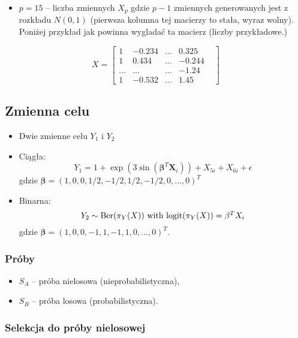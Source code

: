 \documentclass[
]{article}
\providecommand{\tightlist}{%
  \setlength{\itemsep}{0pt}\setlength{\parskip}{0pt}}
\begin{document}
\begin{itemize}
\tightlist
\item
  \(p=15\) -- liczba zmiennych \(X_p\) gdzie \(p-1\) zmiennych
  generowanych jest z rozkładu \(N(0,1)\) (pierwsza kolumna tej macierzy
  to stała, wyraz wolny). Poniżej przykład jak powinna wygladać ta
  macierz (liczby przykładowe.)
\end{itemize}

\[
X=
\begin{bmatrix}
1 & -0.234 & ... &  0.325 & \\
1 & 0.434 & ...  &  -0.244 & \\
... & ... & ...  & -1.24 & \\
1 & -0.532 & ...  & 1.45 & 
\end{bmatrix}
\]

\subsection{Zmienna celu}\label{zmienna-celu}

\begin{itemize}
\item
  Dwie zmienne celu \(Y_1\) i \(Y_2\)
\item
  Ciągła: \[
        Y_1 = 1 + \exp(3\sin(\mathbf{\beta}^T\mathbf{X}_i)) + X_{5i} + X_{6i} + \epsilon
        \] gdzie \(\mathbf{\beta}=(1,0,0,1/2,-1/2,1/2,-1/2,0,...,0)^T\)
\item
  Binarna:
  \[Y_2 \sim \text{Ber}(\pi_Y(X))$ with $\text{logit}(\pi_Y(X)) = \mathbf{\beta}^TX_i
        \] gdzie \(\mathbf{\beta}=(1,0,0,-1,1,-1,1,0,...,0)^T\).
\end{itemize}

\subsubsection{Próby}\label{pruxf3by}

\begin{itemize}
\tightlist
\item
  \(S_A\) -- próba nielosowa (nieprobabilistyczna),
\item
  \(S_B\) -- próba losowa (probabilistyczna).
\end{itemize}

\subsubsection{Selekcja do próby
nielosowej}\label{selekcja-do-pruxf3by-nielosowej}
\end{document}
